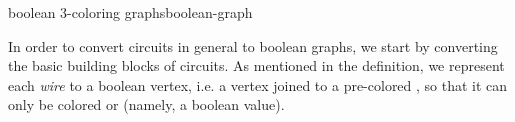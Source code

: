 \begin{definition}{boolean 3-coloring graphs}{boolean-graph}

\end{definition}

%

%
%

In order to convert circuits in general to boolean graphs, we start by
converting the basic building blocks of circuits.  As mentioned in the
definition, we represent each \emph{wire} to a boolean vertex, i.e. a vertex
joined to a pre-colored , so that it can only be colored  or
 (namely, a boolean value).

\begin{center}
\end{center}

